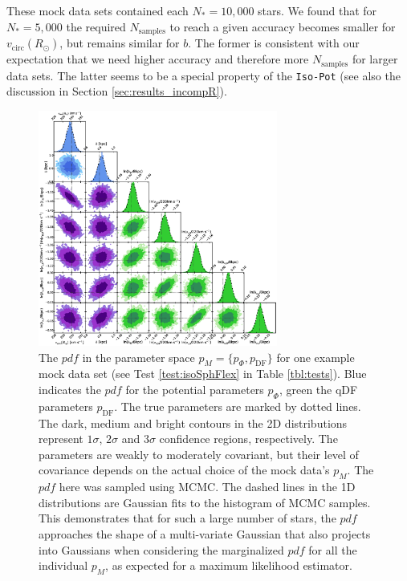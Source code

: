 \documentclass[iop,revtex4,numberedappendix,appendixfloats]{emulateapj}
\newcommand{\pdf}{\ensuremath{pdf}}
\newcommand{\pmodel}{\ensuremath{p_M}}
\begin{document}
These mock data sets contained each $N_{*}=10,000$ stars. We found that for $N_{*}=5,000$ the required $N_\text{samples}$ to reach a given accuracy becomes smaller for $v_\text{circ}(R_\odot)$, but remains similar for $b$. The former is consistent with our expectation that we need higher accuracy and therefore more $N_\text{samples}$ for larger data sets. The latter seems to be a special property of the \texttt{Iso-Pot} (see also the discussion in Section \ref{sec:results_incompR}).


\begin{figure}[!htbp]
\centering
\includegraphics[width=0.7\textwidth]{isoSphFlex_short_hot_2kpc_triangle_MCMC.eps}
\caption{The \pdf{} in the parameter space $\pmodel{} = \{p_\Phi,p_\text{DF}\}$ for one example mock data set (see Test \ref{test:isoSphFlex} in Table \ref{tbl:tests}). Blue indicates the \pdf{} for the potential parameters $p_\Phi$, green the qDF parameters $p_\text{DF}$. The true parameters are marked by dotted lines. The dark, medium and bright contours in the 2D distributions represent $1\sigma$, $2\sigma$ and $3\sigma$ confidence regions, respectively. The parameters are weakly to moderately covariant, but their level of covariance depends on the actual choice of the mock data's \pmodel{}. The \pdf{} here was sampled using MCMC. The dashed lines in the 1D distributions are Gaussian fits to the histogram of MCMC samples. This demonstrates that for such a large number of stars, the \pdf{} approaches the shape of a multi-variate Gaussian that also projects into Gaussians when considering the marginalized \pdf{} for all the individual \pmodel{}, as expected for a maximum likelihood estimator.}
\label{fig:isoSphFlex_triangleplot}
\end{figure}
\end{document}
